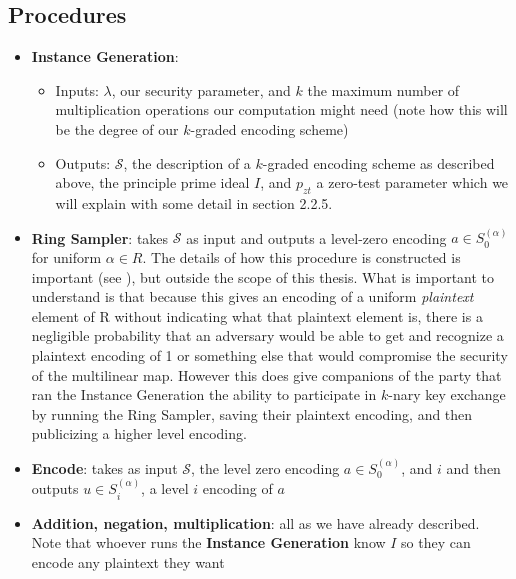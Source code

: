 \documentclass[12pt,twoside]{reedthesis}
\begin{document}
    \subsection{Procedures}
    \begin{itemize}
    \item \textbf{Instance Generation}: 
    	\begin{itemize}
    \item Inputs: $\lambda$, our security parameter, and $k$ the maximum number of multiplication operations our computation might need (note how this will be the degree of our $k$-graded encoding scheme)  
    \item Outputs: $\mathcal{S}$, the description of a $k$-graded encoding scheme as described above, the principle prime ideal $I$, and $p_{zt}$ a zero-test parameter which we will explain with some detail in section 2.2.5.
    	\end{itemize}  
	\item \textbf{Ring Sampler}: takes $\mathcal{S}$ as input and outputs a level-zero encoding $a \in S_0^{(\alpha)}$ for uniform $\alpha \in R$. The details of how this procedure is constructed is important (see \cite{GGH13}), but outside the scope of this thesis. What is important to understand is that because this gives an encoding of a uniform \textit{plaintext} element of R without  indicating what that plaintext element is, there is a negligible probability that an adversary would be able to get and recognize a plaintext encoding of 1 or something else that would compromise the security of the multilinear map. However this does give companions of the party that ran the Instance Generation the ability to participate in $k$-nary key exchange by running the Ring Sampler, saving their plaintext encoding, and then publicizing a higher level encoding.
	\item \textbf{Encode}: takes as input $\mathcal{S}$, the level zero encoding $a\in S_0^{(\alpha)}$, and $i$ and then outputs $u\in S_i^{(\alpha)}$, a level $i$ encoding of $a$
	\item \textbf{Addition, negation, multiplication}: all as we have already described. Note that whoever runs the \textbf{Instance Generation} know $I$ so they can encode any plaintext they want
	
    \end{itemize}
    
\end{document}
